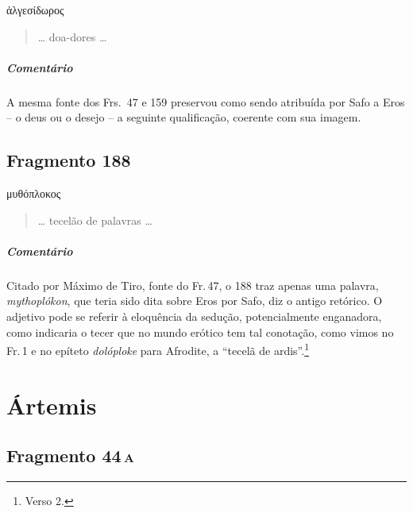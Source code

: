 \begin{gkverse}
ἀλγεσίδωρος
\end{gkverse}

\begin{verse}
\ldots{} doa-dores \ldots{} 
\end{verse}

\medskip

{\paragraph{Comentário} A mesma fonte dos Frs.~47 e 159 preservou como sendo atribuída por Safo a Eros -- o deus ou o desejo -- a seguinte qualificação, coerente com sua imagem.}


\section{Fragmento 188}

\begin{gkverse}
μυθόπλοκος
\end{gkverse}

\begin{verse}
\ldots{} tecelão de palavras \ldots{}
\end{verse}

\medskip

{\paragraph{Comentário} Citado por Máximo de Tiro, fonte do Fr.\,47, o 188 traz apenas uma palavra, \textit{mythoplókon}, que teria sido dita sobre Eros por Safo, diz o antigo retórico. O adjetivo pode se referir à eloquência da sedução, potencialmente enganadora, como indicaria o tecer que no mundo erótico tem tal conotação, como vimos no Fr.\,1 e no epíteto \textit{dolóploke} para Afrodite, a ``tecelã de ardis''.\footnote{Verso 2.}}


\chapter{Ártemis}

\section{Fragmento 44\,\textsc{a}}

